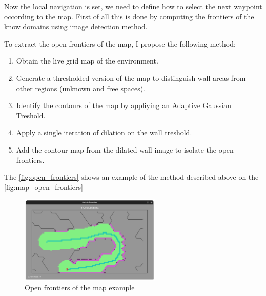 \documentclass[../main.tex]{subfiles}
\begin{document}
Now the local navigation is set, we need to define how to select the next waypoint occording to the map. First of all this is done by computing the frontiers of the know domains using image detection method.


To extract the open frontiers of the map, I propose the following method:
\begin{enumerate}
	\item Obtain the live grid map of the environment.
	\item Generate a thresholded version of the map to distinguish wall areas from other regions (unknown and free spaces).
	\item Identify the contours of the map by appliying an Adaptive Gaussian Treshold.
	\item Apply a single iteration of dilation on the wall treshold.
	\item Add the contour map from the dilated wall image to isolate the open frontiers.
\end{enumerate}

The \autoref{fig:open_frontiers} shows an example of the method described above on the \autoref{fig:map_open_frontiers}

\begin{figure}[H]
	\centering
	\includegraphics[width=0.6\textwidth]{IMAGES/part3/map_open_frontiers.png}
	\caption{Open frontiers of the map example}
	\label{fig:map_open_frontiers}
\end{figure}
\end{document}
